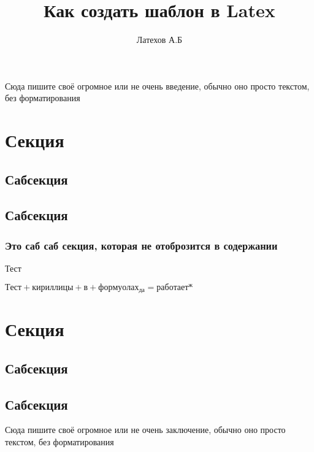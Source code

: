 
\def\institute{Автоматики и информационных технологий}
\def\kafedra{Электроники, телекоммуникации и космических технологий}
\def\tipraboty{СРСП} %
\author{Латехов А.Б}
\title{Как создать шаблон в Latex}
\def\prepod{Гончаров А.Б}
\def\shifrop{0A00000}

	
	
	\tableofcontents
	
	\newpage
	Сюда пишите своё огромное или не очень введение, обычно оно просто текстом, без форматирования
	\newpage
	
	\section{Секция}
	\subsection{Сабсекция}
	\subsection{Сабсекция}
	\subsubsection{Это саб саб секция, которая не отоброзится в содержании}
	Тест\cite{PinillaToro2019}
	
	$Тест + кириллицы + в + формуолах_{да} = работает^ж$
	
	\newpage
	
	\section{Секция}
	\subsection{Сабсекция}
	\subsection{Сабсекция}
	\newpage
	
	Сюда пишите своё огромное или не очень заключение, обычно оно просто текстом, без форматирования
	
	\newpage
	\printbibliography[heading=su]

